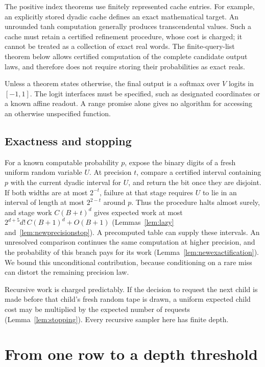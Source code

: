 \documentclass[11pt]{article}
\theoremstyle{definition}
\theoremstyle{remark}
\numberwithin{equation}{section}
\begin{document}
The positive index theorems use finitely represented cache entries.
For example, an explicitly stored dyadic cache defines an exact
mathematical target. An unrounded tanh computation generally produces
transcendental values. Such a cache must retain a certified refinement
procedure, whose cost is charged; it cannot be treated as a collection
of exact real words. The finite-query-list theorem below allows
certified computation of the complete candidate output laws, and
therefore does not require storing their probabilities as exact reals.

Unless a theorem states otherwise, the final output is a softmax over $V$ logits in $[-1,1]$.
The logit interfaces must be specified, such as designated coordinates
or a known affine readout. A range promise alone gives no algorithm
for accessing an otherwise unspecified function.

\subsection{Exactness and stopping}

For a known computable probability $p$, expose the binary digits of
a fresh uniform random variable $U$. At precision $t$, compare a
certified interval containing $p$ with the current dyadic interval for
$U$, and return the bit once they are disjoint. If both widths are at
most $2^{-t}$, failure at that stage requires $U$ to lie in an interval
of length at most $2^{2-t}$ around $p$. Thus the procedure halts almost
surely, and stage work $C(B+t)^d$ gives expected work at most
$2^{d+5}d!\,C(B+1)^d+O(B+1)$
(Lemmas~\ref{lem:lazy} and~\ref{lem:newprecisionstop}). A precomputed
table can supply these intervals. An unresolved comparison continues
the same computation at higher precision, and the probability of this
branch pays for its work (Lemma~\ref{lem:newexactification}). We bound
this unconditional contribution, because conditioning on a rare miss
can distort the remaining precision law.

Recursive work is charged predictably. If the decision to request
the next child is made before that child's fresh random tape is
drawn, a uniform expected child cost may be multiplied by the
expected number of requests (Lemma~\ref{lem:stopping}). Every
recursive sampler here has finite depth.

\section{From one row to a depth threshold}
\label{sec:tanh-main}
\end{document}
